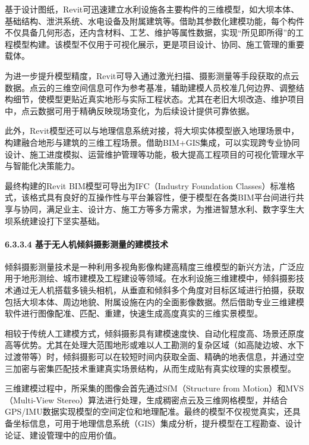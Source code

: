 基于设计图纸，Revit可迅速建立水利设施各主要构件的三维模型，如大坝本体、基础结构、泄洪系统、水电设备及附属建筑等。借助其参数化建模功能，每个构件不仅具备几何形态，还内含材料、工艺、维护等属性数据，实现``所见即所得''的工程模型构建。该模型不仅用于可视化展示，更是项目设计、协同、施工管理的重要载体。

为进一步提升模型精度，Revit可导入通过激光扫描、摄影测量等手段获取的点云数据。点云的三维空间信息可作为参考基准，辅助建模人员校准几何边界、调整结构细节，使模型更贴近真实地形与实际工程状态。尤其在老旧大坝改造、维护项目中，点云数据可用于精确反映现场变化，为后续设计提供可靠依据。

此外，Revit模型还可以与地理信息系统对接，将大坝实体模型嵌入地理场景中，构建融合地形与建筑的三维工程场景。借助BIM+GIS集成，可以实现跨专业协同设计、施工进度模拟、运营维护管理等功能，极大提高工程项目的可视化管理水平与智能化决策能力。

最终构建的Revit BIM模型可导出为IFC（Industry Foundation Classes）标准格式，该格式具有良好的互操作性与平台兼容性，便于模型在各类BIM平台间进行共享与协同，满足业主、设计方、施工方等多方需求，为推进智慧水利、数字孪生大坝系统建设打下坚实基础。

\paragraph{6.3.3.4 基于无人机倾斜摄影测量的建模技术}\label{ux57faux4e8eux65e0ux4ebaux673aux503eux659cux6444ux5f71ux6d4bux91cfux7684ux5efaux6a21ux6280ux672f}

倾斜摄影测量技术是一种利用多视角影像构建高精度三维模型的新兴方法，广泛应用于地形测绘、城市建模及工程建设等领域。在水利设施三维建模中，倾斜摄影技术通过无人机搭载多镜头相机，从垂直和倾斜多个角度对目标区域进行拍摄，获取包括大坝本体、周边地貌、附属设施在内的全面影像数据。然后借助专业三维建模软件进行图像配准、匹配、重建，快速生成高度真实的三维实景模型。

相较于传统人工建模方式，倾斜摄影具有建模速度快、自动化程度高、场景还原度高等优势。尤其在处理大范围地形或难以人工勘测的复杂区域（如高陡边坡、水下过渡带等）时，倾斜摄影可以在较短时间内获取全面、精确的地表信息，并通过空三加密与密集匹配技术重建真实场景结构，从而生成贴有真实纹理的实景模型。

三维建模过程中，所采集的图像会首先通过SfM（Structure from Motion）和MVS（Multi-View Stereo）算法进行处理，生成稠密点云及三维网格模型，并结合GPS/IMU数据实现模型的空间定位和地理配准。最终的模型不仅视觉真实，还具备坐标信息，可用于地理信息系统（GIS）集成分析，提升模型在工程勘查、设计论证、建设管理中的应用价值。

